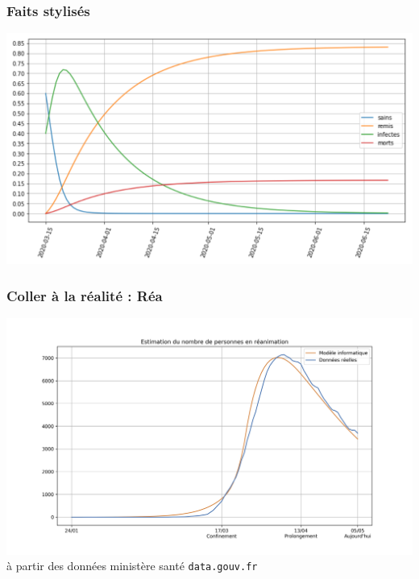 \documentclass[a4paper]{cours-bdd}
\begin{document}

\begin{frame}[fragile]
  \frametitle{Faits stylisés}
  
  \begin{center}
            \includegraphics[width=1.0\linewidth]{fig3_sirgm.png} \\
  \end{center}

  
\end{frame}



\begin{frame}[fragile]
\frametitle{Coller à la réalité : Réa}

  \begin{center}
    \includegraphics[width=1.0\linewidth]{figure1.jpg} \\
    {\tiny à partir des données ministère santé \texttt{data.gouv.fr}}
  \end{center}
  
\end{frame}
\end{document}
